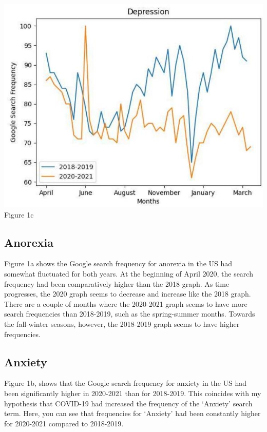 \documentclass{article}
\begin{document}
\begin{center}
\includegraphics[scale=0.50]{2023_08_04_7b2b5ae1fb9d756e7758g-3(2)}
\\ Figure 1c
\end{center}

\subsection{Anorexia}

Figure 1a shows the Google search frequency for anorexia in the US had somewhat fluctuated for
both years. At the beginning of April 2020, the search frequency had been comparatively higher than
the 2018 graph. As time progresses, the 2020 graph seems to decrease and increase like the 2018
graph. There are a couple of months where the 2020-2021 graph seems to have more search
frequencies than 2018-2019, such as the spring-summer months. Towards the fall-winter seasons,
however, the 2018-2019 graph seems to have higher frequencies.

\subsection{Anxiety}

Figure 1b, shows that the Google search frequency for anxiety in the US had been significantly higher
in 2020-2021 than for 2018-2019. This coincides with my hypothesis that COVID-19 had increased the
frequency of the ‘Anxiety’ search term. Here, you can see that frequencies for ‘Anxiety’ had been
constantly higher for 2020-2021 compared to 2018-2019.
\end{document}
